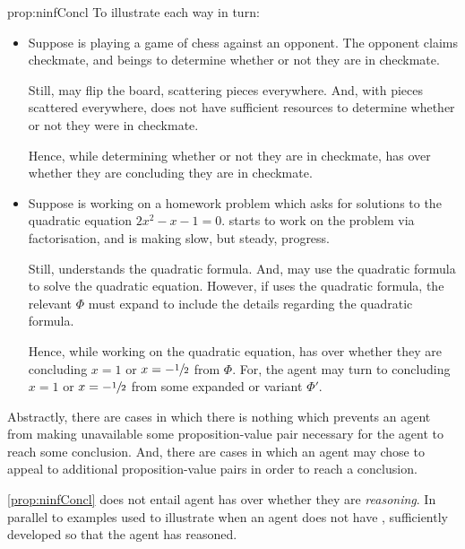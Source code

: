 \begin{note}
\begin{argument}{prop:ninfConcl}
    To illustrate each way in turn:

    \begin{itemize}
    \item
      Suppose \vAgent{} is playing a game of chess against an opponent.
      The opponent claims checkmate, and \vAgent{} beings to determine whether or not they are in checkmate.

      Still, \vAgent{} may flip the board, scattering pieces everywhere.
      And, with pieces scattered everywhere, \vAgent{} does not have sufficient resources to determine whether or not they were in checkmate.

      Hence, while determining whether or not they are in checkmate, \vAgent{} has \ninf{} over whether they are concluding they are in checkmate.
    \end{itemize}

    \begin{itemize}
    \item
      Suppose \vAgent{} is working on a homework problem which asks for solutions to the quadratic equation \(2x^{2} - x - 1 = 0\).
      \vAgent{} starts to work on the problem via factorisation, and is making slow, but steady, progress.

      Still, \vAgent{} understands the quadratic formula.
      And, \vAgent{} may use the quadratic formula to solve the quadratic equation.
      However, if \vAgent{} uses the quadratic formula, the relevant \pool{} \(\Phi\) must expand to include the details regarding the quadratic formula.

      Hence, while working on the quadratic equation, \vAgent{} has \ninf{} over whether they are concluding \(x = 1\) or \(x = -\sfrac{1}{2}\) from \(\Phi\).
      For, the agent may turn to concluding \(x = 1\) or \(x = -\sfrac{1}{2}\) from some expanded or variant \pool{} \(\Phi'\).
    \end{itemize}
    \vspace{-\baselineskip}
  \end{argument}

  Abstractly, there are cases in which there is nothing which prevents an agent from making unavailable some proposition-value pair necessary for the agent to reach some conclusion.
  And, there are cases in which an agent may chose to appeal to additional proposition-value pairs in order to reach a conclusion.
\end{note}

\begin{note}
  \autoref{prop:ninfConcl} does not entail agent has \ninf{} over whether they are \emph{reasoning}.
  In parallel to examples used to illustrate when an agent does not have \ninf{}, sufficiently developed so that the agent has reasoned.
\end{note}


